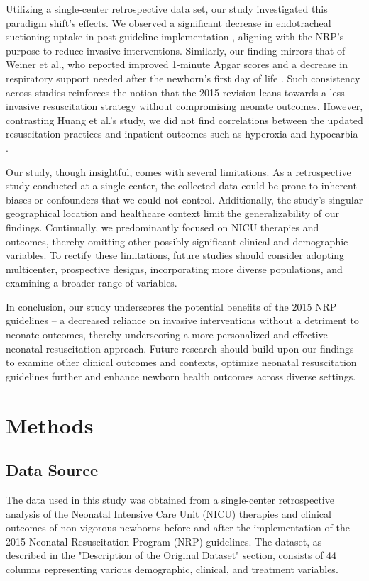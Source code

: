 \documentclass[11pt]{article}
\begin{document}
Utilizing a single-center retrospective data set, our study investigated this paradigm shift's effects. We observed a significant decrease in endotracheal suctioning uptake in post-guideline implementation \cite{Weiner2022UpdatesFT}, aligning with the NRP's purpose to reduce invasive interventions. Similarly, our finding mirrors that of Weiner et al., who reported improved 1-minute Apgar scores and a decrease in respiratory support needed after the newborn's first day of life \cite{Myers2020ImpactOT}. Such consistency across studies reinforces the notion that the 2015 revision leans towards a less invasive resuscitation strategy without compromising neonate outcomes. However, contrasting Huang et al.'s study, we did not find correlations between the updated resuscitation practices and inpatient outcomes such as hyperoxia and hypocarbia \cite{Huang2017ImpactOC}.

Our study, though insightful, comes with several limitations. As a retrospective study conducted at a single center, the collected data could be prone to inherent biases or confounders that we could not control. Additionally, the study's singular geographical location and healthcare context limit the generalizability of our findings. Continually, we predominantly focused on NICU therapies and outcomes, thereby omitting other possibly significant clinical and demographic variables. To rectify these limitations, future studies should consider adopting multicenter, prospective designs, incorporating more diverse populations, and examining a broader range of variables.

In conclusion, our study underscores the potential benefits of the 2015 NRP guidelines – a decreased reliance on invasive interventions without a detriment to neonate outcomes, thereby underscoring a more personalized and effective neonatal resuscitation approach. Future research should build upon our findings to examine other clinical outcomes and contexts, optimize neonatal resuscitation guidelines further and enhance newborn health outcomes across diverse settings.

\section*{Methods}

\subsection*{Data Source}
The data used in this study was obtained from a single-center retrospective analysis of the Neonatal Intensive Care Unit (NICU) therapies and clinical outcomes of non-vigorous newborns before and after the implementation of the 2015 Neonatal Resuscitation Program (NRP) guidelines. The dataset, as described in the "Description of the Original Dataset" section, consists of 44 columns representing various demographic, clinical, and treatment variables.
\end{document}
